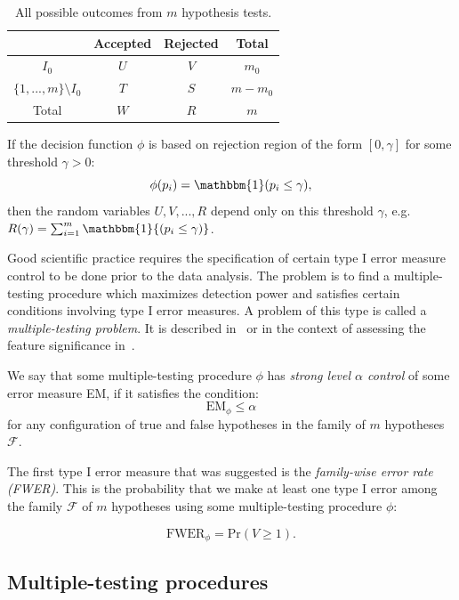 \documentclass[10pt]{article}
\begin{document}
\begin{table}[ht!]
	\centering
	\begin{tabular}{c c c c}
		\hline\hline
		& Accepted     & Rejected & Total \\ [0.5ex]
		\hline
		$I_{0}$ & $U$  & $V$ & $m_{0}$ \\
		$\lbrace 1, ..., m \rbrace \setminus I_{0}$ & $T$  & $S$ & $m - m_{0}$ \\
		Total         & $W$  & $R$ & $m$
	\end{tabular}
	\caption{All possible outcomes from $m$ hypothesis tests.}
	\label{tab: summary}	
\end{table}


If the decision function $\phi$ is based on rejection region of the form $[0, \gamma]$ for some threshold $\gamma > 0$:
\begin{equation}
	\phi(p_{i}) = \mathbbm{1} (p_{i} \leq \gamma),
\end{equation}
then the random variables $U, V, ..., R$ depend only on this threshold $\gamma$, e.g.\ $R(\gamma) = \sum_{i=1}^{m}{\mathbbm{1}{(p_{i} \leq \gamma)}}$.

Good scientific practice requires the specification of certain type I error measure control to be done prior to the data analysis. The problem is to find a multiple-testing procedure which maximizes detection power and satisfies certain conditions involving type I error measures. A problem of this type is called a {\it multiple-testing problem}. It is described in~\cite{RHeller} or in the context of assessing the feature significance in~\cite{ESL}. 

We say that some multiple-testing procedure $\phi$ has {\it strong level $\alpha$ control} of some error measure EM, if it satisfies the condition:
\begin{equation}
\text{EM}_{\phi} \leq \alpha
\end{equation}
for any configuration of true and false hypotheses in the family of $m$ hypotheses $\mathcal{F}$.

The first type I error measure that was suggested is the {\it family-wise error rate (FWER)}. This is the probability that we make at least one type I error among the family $\mathcal{F}$ of $m$ hypotheses using some multiple-testing procedure $\phi$:

\begin{equation}
	\text{FWER}_{\phi} = \text{Pr}(V \geq 1).
\end{equation}


\subsection{Multiple-testing procedures}
\end{document}
